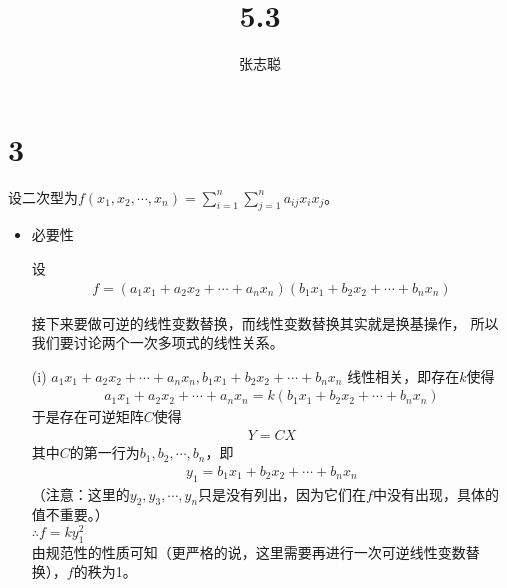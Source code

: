 \documentclass{article}
\begin{document}
\title{5.3}
\author{张志聪}
\maketitle

\section*{3}

设二次型为$f(x_1, x_2, \cdots, x_n) = \sum_{i=1}^n \sum_{j=1}^n a_{ij}x_ix_j$。

\begin{itemize}
  \item 必要性

        设
        \begin{align*}
          f = (a_1 x_1 + a_2 x_2 + \cdots + a_n x_n) (b_1 x_1 + b_2 x_2 + \cdots + b_n x_n)
        \end{align*}

        接下来要做可逆的线性变数替换，而线性变数替换其实就是换基操作，
        所以我们要讨论两个一次多项式的线性关系。

        (i) $a_1 x_1 + a_2 x_2 + \cdots + a_n x_n, b_1 x_1 + b_2 x_2 + \cdots + b_n x_n$
        线性相关，即存在$k$使得
        \begin{align*}
          a_1 x_1 + a_2 x_2 + \cdots + a_n x_n = k(b_1 x_1 + b_2 x_2 + \cdots + b_n x_n)
        \end{align*}
        于是存在可逆矩阵$C$使得
        \begin{align*}
          Y = C X
        \end{align*}
        其中$C$的第一行为$b_1, b_2, \cdots, b_n$，即
        \begin{align*}
          y_1 = b_1 x_1 + b_2 x_2 + \cdots + b_n x_n
        \end{align*}
        （注意：这里的$y_2, y_3, \cdots, y_n$只是没有列出，因为它们在$f$中没有出现，具体的值不重要。）\\
        $\therefore f = k y_1^2$\\
        由规范性的性质可知（更严格的说，这里需要再进行一次可逆线性变数替换），$f$的秩为1。


\end{itemize}
\end{document}
